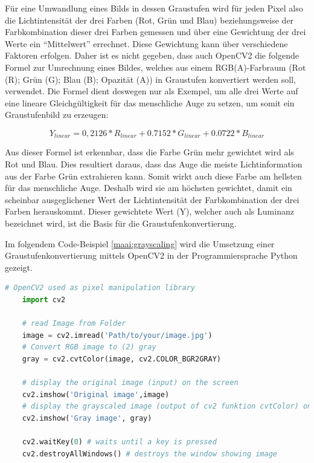 Für eine Umwandlung eines Bilds in dessen Graustufen wird für jeden Pixel also die Lichtintensität der drei Farben (Rot, Grün und Blau) beziehungsweise der Farbkombination dieser drei Farben gemessen und über eine Gewichtung der drei Werte ein ``Mittelwert'' errechnet. Diese Gewichtung kann über verschiedene Faktoren erfolgen. Daher ist es nicht gegeben, dass auch OpenCV2 die folgende Formel zur Umrechnung eines Bildes, welches aus einem RGB(A)-Farbraum (Rot (R); Grün (G); Blau (B); Opazität (A)) in Graustufen konvertiert werden soll, verwendet. Die Formel dient deswegen nur als Exempel, um alle drei Werte auf eine lineare Gleichgültigkeit für das menschliche Auge zu setzen, um somit ein Graustufenbild zu erzeugen:

\[
    Y_{ linear } = 0,2126 * R_{ linear } + 0.7152 * G_{ linear } + 0.0722 * B_{ linear }
\]

Aus dieser Formel ist erkennbar, dass die Farbe Grün mehr gewichtet wird als Rot und Blau. Dies resultiert daraus, dass das Auge die meiste Lichtinformation aus der Farbe Grün extrahieren kann. Somit wirkt auch diese Farbe am hellsten für das menschliche Auge. Deshalb wird sie am höchsten gewichtet, damit ein scheinbar ausgeglichener Wert der Lichtintensität der Farbkombination der drei Farben herauskommt. Dieser gewichtete Wert (Y), welcher auch als Luminanz bezeichnet wird, ist die Basis für die Graustufenkonvertierung.

Im folgendem Code-Beispiel \ref{maai:grayscaling} wird die Umsetzung einer Graustufenkonvertierung mittels OpenCV2 in der Programmiersprache Python gezeigt.

\begin{lstlisting}[caption=Graustufenkonvertierung,language=Python,label=maai:grayscaling]
    # OpenCV2 used as pixel manipulation library
    import cv2
  
    # read Image from Folder
    image = cv2.imread('Path/to/your/image.jpg')
    # Convert RGB image to (2) gray
    gray = cv2.cvtColor(image, cv2.COLOR_BGR2GRAY)
    
    # display the original image (input) on the screen
    cv2.imshow('Original image',image)
    # display the grayscaled image (output of cv2 funktion cvtColor) on the screen
    cv2.imshow('Gray image', gray)
      
    cv2.waitKey(0) # waits until a key is pressed
    cv2.destroyAllWindows() # destroys the window showing image
\end{lstlisting}

